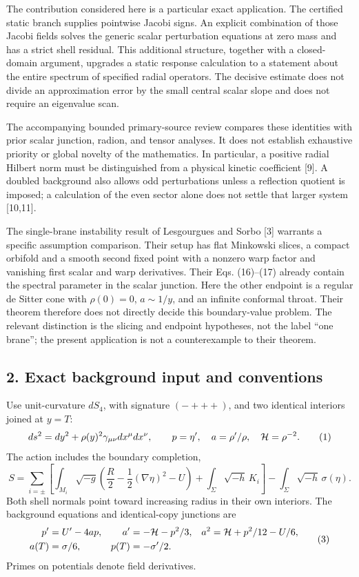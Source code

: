 \documentclass[
  11pt,
]{article}
\begin{document}
The contribution considered here is a particular exact application. The
certified static branch supplies pointwise Jacobi signs. An explicit
combination of those Jacobi fields solves the generic scalar
perturbation equations at zero mass and has a strict shell residual.
This additional structure, together with a closed-domain argument,
upgrades a static response calculation to a statement about the entire
spectrum of specified radial operators. The decisive estimate does not
divide an approximation error by the small central scalar slope and does
not require an eigenvalue scan.

The accompanying bounded primary-source review compares these identities
with prior scalar junction, radion, and tensor analyses. It does not
establish exhaustive priority or global novelty of the mathematics. In
particular, a positive radial Hilbert norm must be distinguished from a
physical kinetic coefficient {[}9{]}. A doubled background also allows
odd perturbations unless a reflection quotient is imposed; a calculation
of the even sector alone does not settle that larger system {[}10,11{]}.

The single-brane instability result of Lesgourgues and Sorbo {[}3{]}
warrants a specific assumption comparison. Their setup has flat
Minkowski slices, a compact orbifold and a smooth second fixed point
with a nonzero warp factor and vanishing first scalar and warp
derivatives. Their Eqs. (16)--(17) already contain the spectral
parameter in the scalar junction. Here the other endpoint is a regular
de Sitter cone with \(\rho(0)=0\), \(a\sim1/y\), and an infinite
conformal throat. Their theorem therefore does not directly decide this
boundary-value problem. The relevant distinction is the slicing and
endpoint hypotheses, not the label ``one brane''; the present
application is not a counterexample to their theorem.

\subsection{2. Exact background input and
conventions}\label{exact-background-input-and-conventions}

Use unit-curvature \(dS_4\), with signature \((-+++)\), and two
identical interiors joined at \(y=T\): \[
 ds^2=dy^2+\rho(y)^2\gamma_{\mu\nu}dx^\mu dx^\nu,\qquad
 p=\eta',\quad a=\rho'/\rho,\quad {\cal H}=\rho^{-2}.
 \tag{1}
\] The action includes the boundary completion, \[
 S=\sum_{i=\pm}\left[
 \int_{M_i}\sqrt{-g}\left(\frac R2-\frac12(\nabla\eta)^2-U\right)
 +\int_\Sigma\sqrt{-h}\,K_i\right]
 -\int_\Sigma\sqrt{-h}\,\sigma(\eta).
 \tag{2}
\] Both shell normals point toward increasing radius in their own
interiors. The background equations and identical-copy junctions are \[
 \begin{aligned}
 p'&=U'-4ap,&
 a'&=-{\cal H}-p^2/3,&
 a^2&={\cal H}+p^2/12-U/6,\\
 a(T)&=\sigma/6,&p(T)&=-\sigma'/2.
 \end{aligned}                                                   \tag{3}
\] Primes on potentials denote field derivatives.
\end{document}
